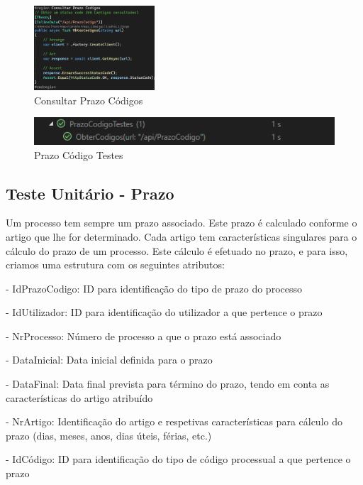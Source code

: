 \begin{figure}[!h]
\centering
\includegraphics[width=0.4\textwidth]{Figuras/TestesUnitarios/PrazoCodigo/Consultar Prazo Códigos.png}
\caption{Consultar Prazo Códigos}
\label{d.unitario}
\end{figure}

\begin{figure}[!h]
\centering
\includegraphics[width=1\textwidth]{Figuras/Testes/PrazoCodigoTestes.png}
\caption{Prazo Código Testes}
\label{d.teste}
\end{figure}


\subsection{Teste Unitário - Prazo}
\indent \par Um processo tem sempre um prazo associado. Este prazo é calculado conforme o artigo que lhe for determinado. Cada artigo tem características singulares para o cálculo do prazo de um processo. Este cálculo é efetuado no prazo, e para isso, criamos uma estrutura com os seguintes atributos:
\indent \par - IdPrazoCodigo: ID para identificação do tipo de prazo do processo
\indent \par - IdUtilizador: ID para identificação do utilizador a que pertence o prazo
\indent \par - NrProcesso: Número de processo a que o prazo está associado
\indent \par - DataInicial: Data inicial definida para o prazo
\indent \par - DataFinal: Data final prevista para término do prazo, tendo em conta as características do artigo atribuído
\indent \par - NrArtigo: Identificação do artigo e respetivas características para cálculo do prazo (dias, meses, anos, dias úteis, férias, etc.)
\indent \par - IdCódigo: ID para identificação do tipo de código processual a que pertence o prazo


